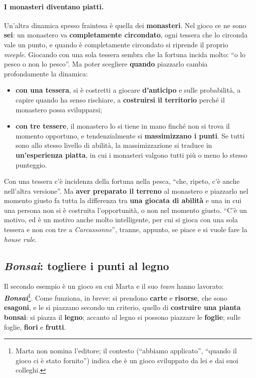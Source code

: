 \paragraph{I monasteri diventano piatti.} Un'altra dinamica spesso fraintesa è quella dei
\textbf{monasteri}. Nel gioco ce ne sono \textbf{sei}: un monastero va \textbf{completamente
circondato}, ogni tessera che lo circonda vale un punto, e quando è completamente circondato si
riprende il proprio \emph{meeple}. Giocando con una sola tessera sembra che la fortuna incida
molto: ``o lo pesco o non lo pesco''. Ma poter scegliere \textbf{quando} piazzarlo cambia
profondamente la dinamica:
\begin{itemize}
  \item \textbf{con una tessera}, si è costretti a giocare \textbf{d'anticipo} e sulle
        probabilità, a capire quando ha senso rischiare, a \textbf{costruirsi il territorio}
        perché il monastero possa svilupparsi;
  \item \textbf{con tre tessere}, il monastero lo si tiene in mano finché non si trova il
        momento opportuno, e tendenzialmente si \textbf{massimizzano i punti}. Se tutti sono
        allo stesso livello di abilità, la massimizzazione si traduce in \textbf{un'esperienza
        piatta}, in cui i monasteri valgono tutti più o meno lo stesso punteggio.
\end{itemize}
Con una tessera c'è incidenza della fortuna nella pesca, ``che, ripeto, c'è anche nell'altra
versione''. Ma \textbf{aver preparato il terreno} al monastero e piazzarlo nel momento giusto fa
tutta la differenza tra \textbf{una giocata di abilità} e una in cui una persona non si è
costruita l'opportunità, o non nel momento giusto. ``C'è un motivo, ed è un motivo anche molto
intelligente, per cui si gioca con una sola tessera e non con tre a \emph{Carcassonne}'',
tranne, appunto, se piace e si vuole fare la \emph{house rule}.

\subsection{\emph{Bonsai}: togliere i punti al legno}



Il secondo esempio è un gioco su cui Marta e il suo \emph{team} hanno lavorato:
\textbf{\emph{Bonsai}}\footnote{Marta non nomina l'editore; il contesto (``abbiamo applicato'',
``quando il gioco ci è stato fornito'') indica che è un gioco sviluppato da lei e dai suoi
colleghi.}. Come funziona, in breve: si prendono \textbf{carte} e \textbf{risorse}, che sono
\textbf{esagoni}, e le si piazzano secondo un criterio, quello di \textbf{costruire una pianta
bonsai}: si piazza il \textbf{legno}; accanto al legno si possono piazzare le \textbf{foglie};
sulle foglie, \textbf{fiori} e \textbf{frutti}.

